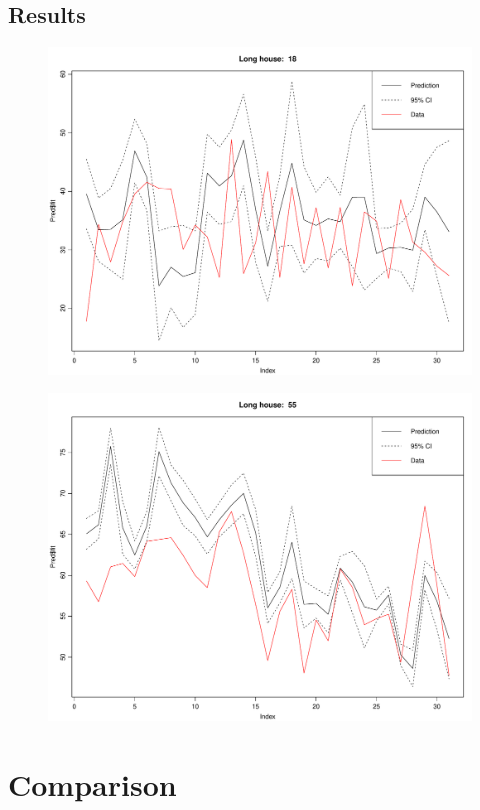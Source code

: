 \subsection{Results}
\begin{figure}
    \centering
    \includegraphics[width=.8\textwidth]{../../../figures/lmpred_18L.pdf}
    \caption{}
    \label{fig: lmpred_18L}
\end{figure}
\begin{figure}
    \centering
    \includegraphics[width=.8\textwidth]{../../../figures/lmpred_55L.pdf}
    \caption{}
    \label{fig: lmpred_55L}
\end{figure}

\section{Comparison}
